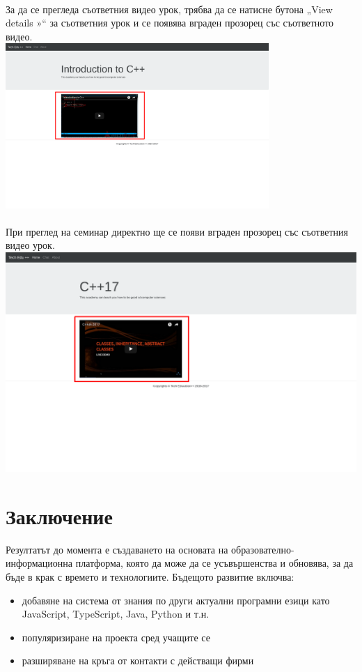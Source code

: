 \documentclass[12pt]{article}
\begin{document}
	\\За да се прегледа съответния видео урок, трябва да се натисне бутона „View details »“ за съответния урок и се появява вграден прозорец със съответното видео.\\
	\includegraphics[width=0.75\textwidth]{track_video.png}\\
	\\При преглед на семинар директно ще се появи вграден прозорец със съответния видео урок.\\
	\includegraphics[width=1\textwidth]{seminar_video.png}\\
	\section{Заключение}
	Резултатът до момента е създаването на основата на образователно-информационна платформа, която да може да се усъвършенства и обновява, за да бъде в крак с времето и технологиите. 
	Бъдещото развитие включва:
	\begin{itemize}
		\item добавяне на система от знания по други актуални програмни езици като JavaScript, TypeScript, Java, Python и т.н.
		\item популяризиране на проекта сред учащите се
		\item разширяване на кръга от контакти с действащи фирми
	\end{itemize}
\end{document}
